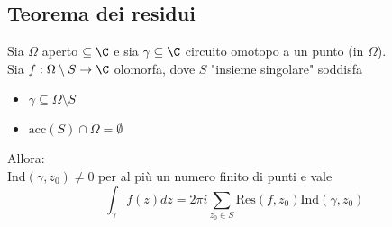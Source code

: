 \subsection{Teorema dei residui}
\begin{tcolorbox}
	Sia $\Omega$ aperto $\subseteq\C$ e sia  $\gamma \subseteq\C$ circuito omotopo a un punto (in $\Omega$).
	\\Sia $f:\Omega\setminus S\to \C$ olomorfa, dove $S$ "insieme singolare" soddisfa
	\begin{itemize}
		\item $\gamma \subseteq\Omega \setminus S$
		\item $\text{acc} (S)\cap\Omega = \emptyset$
	\end{itemize}
	Allora:
	\\$\text{Ind}(\gamma,z_0)\neq 0$ per al più un numero finito di punti e vale
	\[\int_{\gamma}^{} f(z)dz=2\pi i \sum_{z_0\in S}^{} \text{Res}(f,z_0)\text{Ind}(\gamma,z_0)\] 
\end{tcolorbox}


